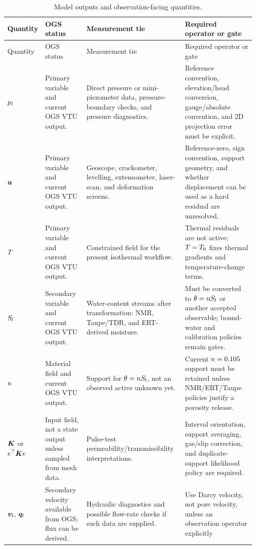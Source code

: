 \begingroup
\small
\setlength{\tabcolsep}{3pt}
\begin{longtable}{@{}L{0.17\textwidth} L{0.21\textwidth} L{0.25\textwidth} L{0.27\textwidth}@{}}
\caption{Model outputs and observation-facing quantities.}
\label{tab:outputs-observation-ties}\\
\toprule
Quantity & OGS status & Measurement tie & Required operator or gate\\
\midrule
\endfirsthead
\toprule
Quantity & OGS status & Measurement tie & Required operator or gate\\
\midrule
\endhead
\bottomrule
\endlastfoot
\(p_l\) &
Primary variable and current OGS VTU output. &
Direct pressure or mini-piezometer data, pressure-boundary checks, and pressure
diagnostics. &
Reference convention, elevation/head conversion, gauge/absolute convention, and 2D
projection error must be explicit.\\
\(\bm{u}\) &
Primary variable and current OGS VTU output. &
Geoscope, crackometer, levelling, extensometer, laser-scan, and deformation screens. &
Reference-zero, sign convention, support geometry, and whether displacement can be
used as a hard residual are unresolved.\\
\(T\) &
Primary variable and current OGS VTU output. &
Constrained field for the present isothermal workflow. &
Thermal residuals are not active; \(T=T_0\) fixes thermal gradients and
temperature-change terms.\\
\(S_l\) &
Secondary variable and current OGS VTU output. &
Water-content streams after transformation: NMR, Taupe/TDR, and ERT-derived moisture. &
Must be converted to \(\theta=nS_l\) or another accepted observable; bound-water and
calibration policies remain gates.\\
\(n\) &
Material field and current OGS VTU output. &
Support for \(\theta=nS_l\), not an observed active unknown yet. &
Current \(n=0.105\) support must be retained unless NMR/ERT/Taupe policies justify a
porosity release.\\
\(\bm{K}\) or \(e^\top\bm{K} e\) &
Input field, not a state output unless sampled from mesh data. &
Pulse-test permeability/transmissibility interpretations. &
Interval orientation, support averaging, gas/slip correction, and duplicate-support
likelihood policy are required.\\
\(\bm{v}_{l}\), \(\bm{q}_{l}\) &
Secondary velocity available from OGS; flux can be derived. &
Hydraulic diagnostics and possible flow-rate checks if such data are supplied. &
Use Darcy velocity, not pore velocity, unless an observation operator explicitly

\end{longtable}

